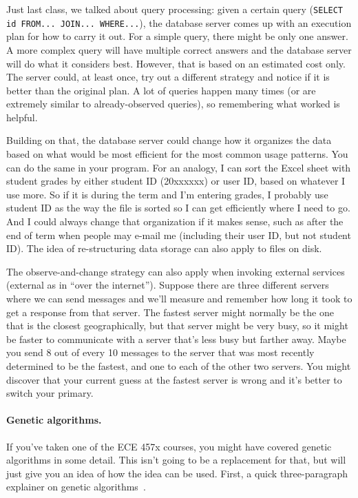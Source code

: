 Just last class, we talked about query processing: given a certain query (\texttt{SELECT id FROM... JOIN... WHERE...}), the database server comes up with an execution plan for how to carry it out. For a simple query, there might be only one answer. A more complex query will have multiple correct answers and the database server will do what it considers best. However, that is based on an estimated cost only. The server could, at least once, try out a different strategy and notice if it is better than the original plan. A lot of queries happen many times (or are extremely similar to already-observed queries), so remembering what worked is helpful.

Building on that, the database server could change how it organizes the data based on what would be most efficient for the most common usage patterns. You can do the same in your program. For an analogy, I can sort the Excel sheet with student grades by either student ID (20xxxxxx) or user ID, based on whatever I use more. So if it is during the term and I'm entering grades, I probably use student ID as the way the file is sorted so I can get efficiently where I need to go. And I could always change that organization if it makes sense, such as after the end of term when people may e-mail me (including their user ID, but not student ID). The idea of re-structuring data storage can also apply to files on disk.

The observe-and-change strategy can also apply when invoking external services (external as in ``over the internet''). Suppose there are three different servers where we can send messages and we'll measure and remember how long it took to get a response from that server. The fastest server might normally be the one that is the closest geographically, but that server might be very busy, so it might be faster to communicate with a server that's less busy but farther away. Maybe you send 8 out of every 10 messages to the server that was most recently determined to be the fastest, and one to each of the other two servers. You might discover that your current guess at the fastest server is wrong and it's better to switch your primary.


\paragraph{Genetic algorithms.}
If you've taken one of the ECE 457x courses, you might have covered genetic algorithms in some detail. This isn't going to be a replacement for that, but will just give you an idea of how the idea can be used. First, a quick three-paragraph explainer on genetic algorithms~\cite{genetic}.

